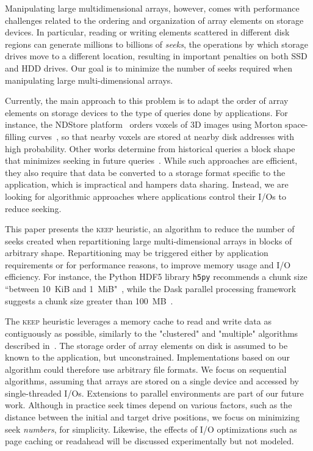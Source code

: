 \documentclass[sigconf, nonacm]{acmart}
\newcommand{\keep}[0]{\textsc{keep}\xspace}
\begin{document}
Manipulating large multidimensional arrays, however, comes with performance
challenges related to the ordering and organization of array elements on
storage devices. In particular, reading or writing elements scattered in different
disk regions can generate millions to billions of \emph{seeks}, the
operations by which storage drives move to a different location, resulting
in important penalties on both SSD and HDD drives. Our goal is to minimize the number of seeks required when manipulating
large multi-dimensional arrays.

Currently, the main approach to this problem is to adapt the order of array
elements on storage devices to the type of queries done by applications.
For instance, the NDStore platform~\cite{lillaney2018building} orders voxels of 3D images
using Morton space-filling curves~\cite{morton1966computer}, so that nearby
voxels are stored at nearby disk addresses with high
probability. Other works determine from historical queries a
block shape that minimizes seeking
in future queries~\cite{optimal_chuking}.
While such approaches are efficient, they also require that data
be converted to a storage format specific to the application, which is
impractical and hampers data sharing. Instead, we are looking for
algorithmic approaches where applications control their I/Os to reduce seeking.

This paper presents the \keep heuristic, an algorithm to reduce the
number of seeks created when repartitioning large multi-dimensional arrays in blocks of
arbitrary shape. Repartitioning may be triggered either by application requirements
 or for performance reasons, to improve
memory usage and I/O efficiency. For instance, the Python HDF5 library
\texttt{h5py} recommends a chunk size ``between 10~KiB and 1~MiB"~\cite{collette_2014}, while the Dask parallel processing framework
~\cite{matthew_rocklin-proc-scipy-2015} suggests a chunk size greater than
100~MB~\cite{rocklin_bourbeau_2019}.

The \keep heuristic leverages a memory cache to read and write data as
contiguously as possible, similarly to the "clustered" and "multiple"
algorithms described in~\cite{seqalgorithms}. The storage order of array
elements on disk is assumed to be known to the application, but unconstrained.
Implementations based on our algorithm could therefore use arbitrary file
formats. We focus on sequential algorithms, assuming that arrays are stored
on a single device and accessed by single-threaded I/Os. Extensions to parallel
environments are part of our future work. Although in practice seek times
depend on various factors, such as the distance between the initial and
target drive positions, we focus on minimizing seek \emph{numbers}, for
simplicity. Likewise, the effects of I/O optimizations such as page caching
or readahead will be discussed experimentally but not modeled.
\end{document}
